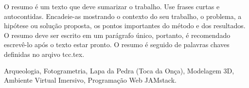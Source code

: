 O resumo é um texto que deve sumarizar o trabalho.
Use frases curtas e autocontidas. 
Encadeie-as mostrando o contexto do seu trabalho, o problema, a hipótese ou solução proposta, os pontos importantes do método e dos resultados.
O resumo deve ser escrito em um parágrafo único, portanto, é recomendado escrevê-lo após o texto estar pronto. 
O resumo é seguido de palavras chaves definidas no arqivo tcc.tex.

\begin{keywords}
Arqueologia, Fotogrametria, Lapa da Pedra (Toca da Onça), Modelagem 3D, Ambiente Virtual Imersivo, Programação Web JAMstack.
\end{keywords}